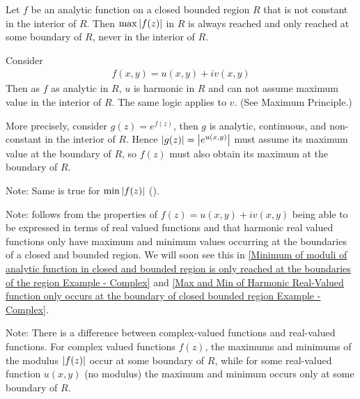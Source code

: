 \documentclass[12pt, english]{book}
\makeatletter
\renewenvironment{proof}[1][\proofname]{\par
	\pushQED{\qed}%
	\normalfont \topsep6\p@\@plus6\p@\relax
	\list{}{%
		\settowidth{\leftmargin}{\itshape\proofname:\hskip\labelsep}%
		\setlength{\labelwidth}{0pt}%
		\setlength{\itemindent}{-\leftmargin}%
		}%
	\item[\hskip\labelsep\itshape#1\@addpunct{:}]\ignorespaces
	}{\popQED\endlist\@endpefalse}
\makeatother
\begin{document}
	\begin{corollary}
		\label{Maximum of moduli of analytic function in closed and bounded region is only reached at the boundaries of the region Corollary - Complex}
		Let \(f\) be an analytic function on a closed bounded region \(R\) that is not constant in the interior of \(R\). Then \(\max\abs{f(z)}\) in \(R\) is always reached and only reached at some boundary of \(R\), never in the interior of \(R\).
	\end{corollary}
	\begin{proof}
		Consider 
		\begin{align*}
			f(x,y) = u(x,y) + iv(x,y)
		\end{align*}
		Then as \(f\) as analytic in \(R\), \(u\) is harmonic in \(R\) and can not assume maximum value in the interior of \(R\). The same logic applies to \(v\). (See Maximum Principle.)
		
		More precisely, consider \(g(z) = e^{f(z)}\), then \(g\) is analytic, continuous, and non-constant in the interior of \(R\). Hence \(\abs{g(z)} = \abs{e^{u(x,y)}}\) must assume its maximum value at the boundary of \(R\), so \(f(z)\) must also obtain its maximum at the boundary of \(R\).
	\end{proof}
	
	Note: Same is true for \(\min\abs{f(z)}\) ().
	
	Note:  follows from the properties of \(f(z) = u(x,y) + iv(x,y)\) being able to be expressed in terms of real valued functions and that harmonic real valued functions only have maximum and minimum values occurring at the boundaries of a closed and bounded region. We will soon see this in \cref{Minimum of moduli of analytic function in closed and bounded region is only reached at the boundaries of the region Example - Complex} and \cref{Max and Min of Harmonic Real-Valued function only occurs at the boundary of closed bounded region Example - Complex}.
	
	Note: There is a difference between complex-valued functions and real-valued functions. For complex valued functions \(f(z)\), the maximums and minimums of the modulus \(\abs{f(z)}\) occur at some boundary of \(R\), while for some real-valued function \(u(x,y)\) (no modulus) the maximum and minimum occurs only at some boundary of \(R\).
	
\end{document}

